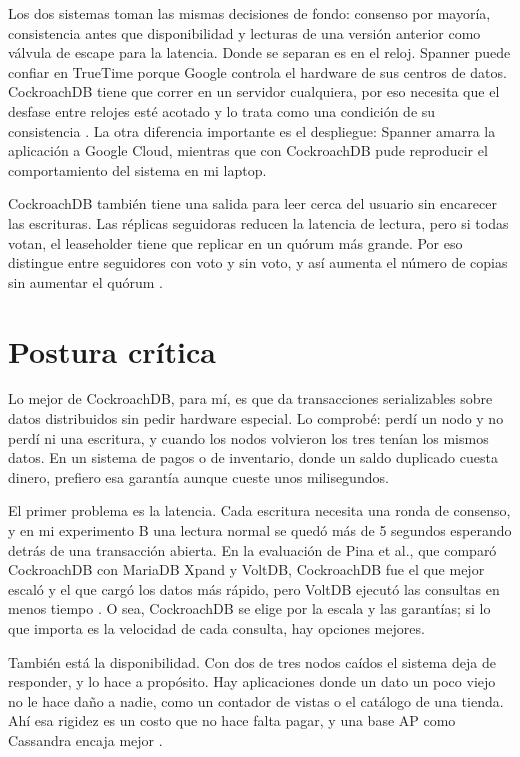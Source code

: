 \documentclass[12pt,a4paper]{article}
\begin{document}
Los dos sistemas toman las mismas decisiones de fondo: consenso por mayoría, consistencia antes que disponibilidad y lecturas de una versión anterior como válvula de escape para la latencia. Donde se separan es en el reloj. Spanner puede confiar en TrueTime porque Google controla el hardware de sus centros de datos. CockroachDB tiene que correr en un servidor cualquiera, por eso necesita que el desfase entre relojes esté acotado y lo trata como una condición de su consistencia \cite{ajmani2022demo}. La otra diferencia importante es el despliegue: Spanner amarra la aplicación a Google Cloud, mientras que con CockroachDB pude reproducir el comportamiento del sistema en mi laptop.

CockroachDB también tiene una salida para leer cerca del usuario sin encarecer las escrituras. Las réplicas seguidoras reducen la latencia de lectura, pero si todas votan, el leaseholder tiene que replicar en un quórum más grande. Por eso distingue entre seguidores con voto y sin voto, y así aumenta el número de copias sin aumentar el quórum \cite{ajmani2022demo}.

\section{Postura crítica}

Lo mejor de CockroachDB, para mí, es que da transacciones serializables sobre datos distribuidos sin pedir hardware especial. Lo comprobé: perdí un nodo y no perdí ni una escritura, y cuando los nodos volvieron los tres tenían los mismos datos. En un sistema de pagos o de inventario, donde un saldo duplicado cuesta dinero, prefiero esa garantía aunque cueste unos milisegundos.

El primer problema es la latencia. Cada escritura necesita una ronda de consenso, y en mi experimento B una lectura normal se quedó más de 5 segundos esperando detrás de una transacción abierta. En la evaluación de Pina et al., que comparó CockroachDB con MariaDB Xpand y VoltDB, CockroachDB fue el que mejor escaló y el que cargó los datos más rápido, pero VoltDB ejecutó las consultas en menos tiempo \cite{pina2023newsql}. O sea, CockroachDB se elige por la escala y las garantías; si lo que importa es la velocidad de cada consulta, hay opciones mejores.

También está la disponibilidad. Con dos de tres nodos caídos el sistema deja de responder, y lo hace a propósito. Hay aplicaciones donde un dato un poco viejo no le hace daño a nadie, como un contador de vistas o el catálogo de una tienda. Ahí esa rigidez es un costo que no hace falta pagar, y una base AP como Cassandra encaja mejor \cite{ahmed2023consistency}.
\end{document}
